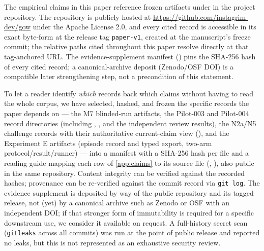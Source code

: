 \documentclass[11pt]{article}
\theoremstyle{gowthm}
\theoremstyle{gowplain}
\begin{document}
The empirical claims in this paper reference frozen artifacts under
 in the project repository. The repository is
publicly hosted at
\url{https://github.com/instagrim-dev/gow} under the Apache License 2.0, and
every cited record is accessible in its exact byte-form at the release tag
\texttt{paper-v1}, created at the manuscript's freeze commit; the relative
paths cited throughout this paper resolve directly at that tag-anchored URL.
The evidence-supplement manifest
() pins the SHA-256 hash of
every cited record; a canonical-archive deposit (Zenodo/OSF DOI) is a
compatible later strengthening step, not a precondition of this statement.

To let a reader identify \emph{which} records back which claims without
having to read the whole corpus, we have selected, hashed, and frozen the
specific records the paper depends on --- the M7 blinded-run artifacts, the
Pilot-003 and Pilot-004 record directories (including ,
, and the independent review results), the
N2a/N5 challenge records with their authoritative current-claim view
(), and the Experiment E artifacts (episode record
and typed export, two-arm protocol/result/runner) --- into a manifest with a
SHA-256 hash per file and
a reading guide mapping each row of \cref{app:claims} to its source file
(,
), also public in the same
repository. Content integrity can be verified against the recorded hashes;
provenance can be re-verified against the commit record via
\texttt{git log}. The evidence supplement is deposited by way of the
public repository and its tagged release, not (yet) by a canonical archive
such as Zenodo or OSF with an independent DOI; if that stronger form of
immutability is required for a specific downstream use, we consider it
available on request.
A full-history secret scan (\texttt{gitleaks} across all commits) was run at
the point of public release and reported no leaks, but this is not
represented as an exhaustive security review.




\appendix
\end{document}

